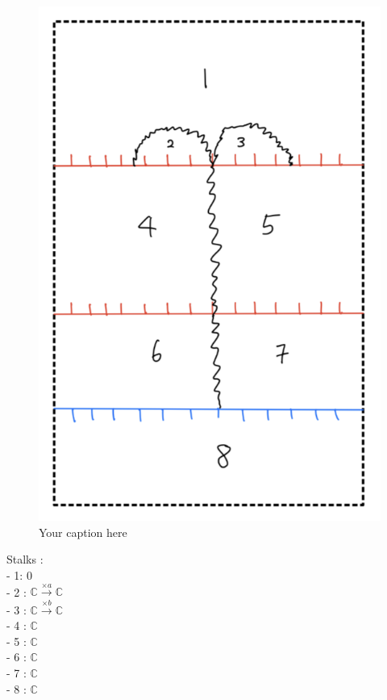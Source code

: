 \begin{figure}[H] %
    \centering
    \includegraphics[width=\linewidth]{diagrams/lemma8/2.png} %
    \caption{Your caption here}
    \label{fig:your-label}
\end{figure}

Stalks : \\
- 1: $0$\\
- 2 : $\mathbb{C}\xrightarrow{\times a}\mathbb{C}$\\
- 3 : $\mathbb{C}\xrightarrow{\times b}\mathbb{C}$\\
- 4 : $\mathbb{C}$\\
- 5 : $\mathbb{C}$\\
- 6 : $\mathbb{C}$\\
- 7 : $\mathbb{C}$\\
- 8 : $\mathbb{C}$\\

